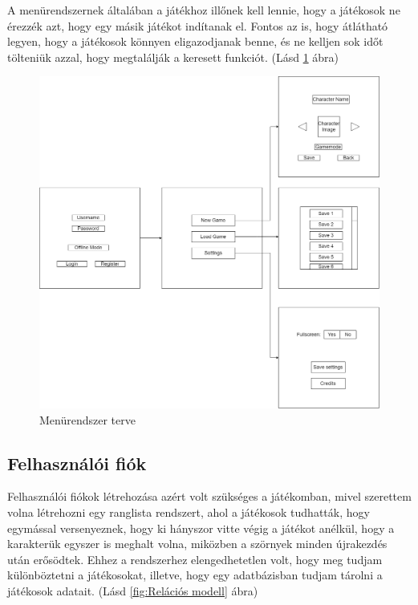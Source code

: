\indent \indent A menürendszernek általában a játékhoz illőnek kell lennie, hogy a játékosok ne érezzék azt, hogy egy másik játékot indítanak el. Fontos az is, hogy átlátható legyen, hogy a játékosok könnyen eligazodjanak benne, és ne kelljen sok időt tölteniük azzal, hogy megtalálják a keresett funkciót. (Lásd \ref{fig:Menürendszer terve} ábra)

\begin{figure}[H]
    \centering
    \includegraphics[width=14.0truecm]{images/MS_menu.drawio.png}
    \caption{Menürendszer terve}
    \label{fig:Menürendszer terve}
\end{figure}

\subsection{Felhasználói fiók}
\indent \indent Felhasználói fiókok létrehozása azért volt szükséges a játékomban, mivel szerettem volna létrehozni egy ranglista rendszert, ahol a játékosok tudhatták, hogy egymással versenyeznek, hogy ki hányszor vitte végig a játékot anélkül, hogy a karakterük egyszer is meghalt volna, miközben a szörnyek minden újrakezdés után erősödtek. Ehhez a rendszerhez elengedhetetlen volt, hogy meg tudjam különböztetni a játékosokat, illetve, hogy egy adatbázisban tudjam tárolni a játékosok adatait. (Lásd \ref{fig:Relációs modell} ábra)

